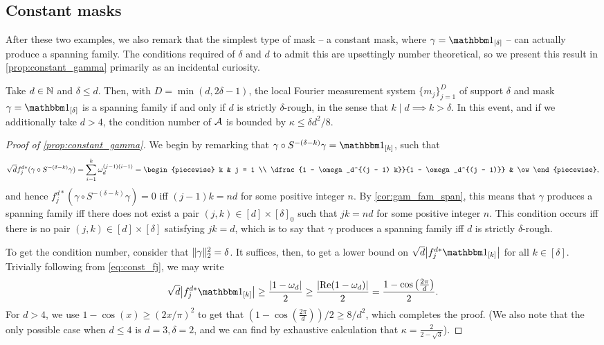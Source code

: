 \subsection{Constant masks}
\label{sec:const_mask}
After these two examples, we also remark that the simplest type of mask -- a constant mask, where $\gamma = \one_{[\delta]}$ -- can actually produce a spanning family.  The conditions required of $\delta$ and $d$ to admit this are upsettingly number theoretical, so we present this result in \cref{prop:constant_gamma} primarily as an incidental curiosity.

\begin{proposition}
  Take $d \in \mathbb{N}$ and $\delta \le d$.  Then, with $D = \min(d, 2 \delta - 1)$, the local Fourier measurement system $\{m_j\}_{j = 1}^D$ of support $\delta$ and mask $\gamma = \one_{[\delta]}$ is a spanning family if and only if $d$ is strictly $\delta$-rough, in the sense that $k \mid d \implies k > \delta$.  In this event, and if we additionally take $d > 4$, the condition number of $\mathcal{A}$ is bounded by $\kappa \le \delta d^2 / 8$.
  \label{prop:constant_gamma}
\end{proposition}

\begin{proof}[Proof of \cref{prop:constant_gamma}]
  We begin by remarking that $\gamma \circ S^{-(\delta - k)} \gamma = \one_{[k]}$, such that \begin{equation} \sqrt{d} f_j^{d*} (\gamma \circ S^{-(\delta - k)} \gamma) = \sum_{i = 1}^k \omega_d^{(j - 1) (i - 1)} = \begin{piecewise} k & j = 1 \\ \dfrac{1 - \omega_d^{(j - 1) k}}{1 - \omega_d^{(j - 1)}} & \ow \end{piecewise}, \label{eq:const_fj}\end{equation} and hence $f_j^{d*}(\gamma \circ S^{- (\delta - k)} \gamma) = 0$ iff $(j - 1) k = n d$ for some positive integer $n$.  By \cref{cor:gam_fam_span}, this means that $\gamma$ produces a spanning family iff there does not exist a pair $(j, k) \in [d] \times [\delta]_0$ such that $j k = n d$ for some positive integer $n$.  This condition occurs iff there is no pair $(j, k) \in [d] \times [\delta]$ satisfying $j k = d$, which is to say that $\gamma$ produces a spanning family iff $d$ is strictly $\delta$-rough.

  To get the condition number, consider that $\lVert\gamma\rVert_2^2 = \delta$.  It suffices, then, to get a lower bound on $\sqrt{d} \abs*{f_j^{d*} \one_{[k]}}$ for all $k \in [\delta]$.   Trivially following from \eqref{eq:const_fj}, we may write \[\sqrt{d} \abs*{f_j^{d*} \one_{[k]}} \ge \dfrac{\abs{1 - \omega_d}}{2} \ge \dfrac{\abs{\Re(1 - \omega_d)}}{2} = \dfrac{1 - \cos\left(\frac{2 \pi}{d}\right)}{2}.\]  For $d > 4$, we use $1 - \cos(x) \ge (2 x / \pi)^2$ to get that $(1 - \cos(\frac{2 \pi}{d})) / 2 \ge 8 / d^2$, which completes the proof.  (We also note that the only possible case when $d \le 4$ is $d = 3, \delta = 2$, and we can find by exhaustive calculation that $\kappa = \frac{2}{2 - \sqrt{3}}$).
\end{proof}

